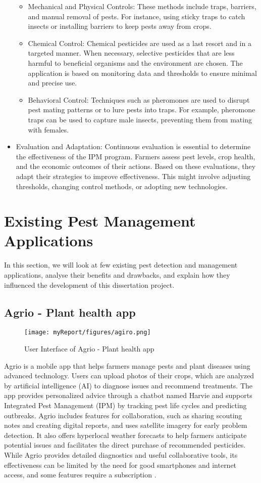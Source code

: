 \begin{itemize}
\begin{itemize}
        \item Mechanical and Physical Controls: These methods include traps, barriers, and manual removal of pests. For instance, using sticky traps to catch insects or installing barriers to keep pests away from crops.
        \item Chemical Control: Chemical pesticides are used as a last resort and in a targeted manner. When necessary, selective pesticides that are less harmful to beneficial organisms and the environment are chosen. The application is based on monitoring data and thresholds to ensure minimal and precise use.
        \item Behavioral Control: Techniques such as pheromones are used to disrupt pest mating patterns or to lure pests into traps. For example, pheromone traps can be used to capture male insects, preventing them from mating with females.
    \end{itemize}
    \item Evaluation and Adaptation: Continuous evaluation is essential to determine the effectiveness of the IPM program. Farmers assess pest levels, crop health, and the economic outcomes of their actions. Based on these evaluations, they adapt their strategies to improve effectiveness. This might involve adjusting thresholds, changing control methods, or adopting new technologies.
\end{itemize}

\section{Existing Pest Management Applications}
In this section, we will look at few existing pest detection and management applications, analyse their benefits and drawbacks, and explain how they influenced the development of this dissertation project.

\subsection{Agrio - Plant health app}
\begin{figure}[ht]
\texttt{[image: myReport/figures/agiro.png]}
\caption{User Interface of Agrio - Plant health app}
\end{figure}
Agrio is a mobile app that helps farmers manage pests and plant diseases using advanced technology. Users can upload photos of their crops, which are analyzed by artificial intelligence (AI) to diagnose issues and recommend treatments. The app provides personalized advice through a chatbot named Harvie and supports Integrated Pest Management (IPM) by tracking pest life cycles and predicting outbreaks. Agrio includes features for collaboration, such as sharing scouting notes and creating digital reports, and uses satellite imagery for early problem detection. It also offers hyperlocal weather forecasts to help farmers anticipate potential issues and facilitates the direct purchase of recommended pesticides. While Agrio provides detailed diagnostics and useful collaborative tools, its effectiveness can be limited by the need for good smartphones and internet access, and some features require a subscription \cite{agrio_protect}.


